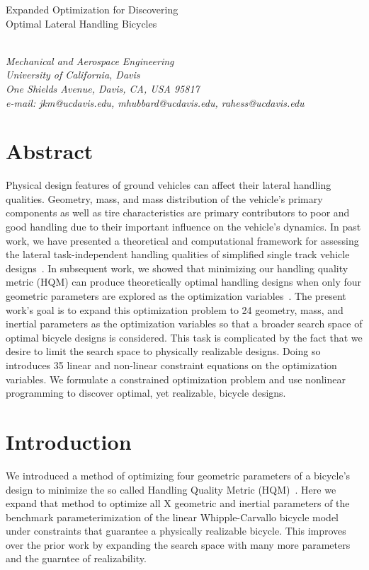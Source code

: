 \documentclass{bmd2019a}
\begin{document}
\begin{flushleft}
{\fontsize{16pt}{20pt}\selectfont%
  Expanded Optimization for Discovering\\}
{\fontsize{16pt}{20pt}\selectfont%
  Optimal Lateral Handling Bicycles}
\end{flushleft}

\begin{flushleft}
  {\\}
  \textit{Mechanical and Aerospace Engineering\\
          University of California, Davis\\
          One Shields Avenue, Davis, CA, USA 95817\\
          e-mail: jkm@ucdavis.edu, mhubbard@ucdavis.edu, rahess@ucdavis.edu}
\end{flushleft}

\section*{Abstract}
%
Physical design features of ground vehicles can affect their lateral handling
qualities. Geometry, mass, and mass distribution of the vehicle's primary
components as well as tire characteristics are primary contributors to poor and
good handling due to their important influence on the vehicle's dynamics. In
past work, we have presented a theoretical and computational framework for
assessing the lateral task-independent handling qualities of simplified single
track vehicle designs~\cite{Hess2012,Moore2012}. In subsequent work, we showed
that minimizing our handling quality metric (HQM) can produce theoretically
optimal handling designs when only four geometric parameters are explored as
the optimization variables~\cite{Moore2016}. The present work's goal is to
expand this optimization problem to 24 geometry, mass, and inertial parameters
as the optimization variables so that a broader search space of optimal bicycle
designs is considered. This task is complicated by the fact that we desire to
limit the search space to physically realizable designs. Doing so introduces 35
linear and non-linear constraint equations on the optimization variables. We
formulate a constrained optimization problem and use nonlinear programming to
discover optimal, yet realizable, bicycle designs.

\section*{Introduction}
%
We introduced a method of optimizing four geometric parameters of a bicycle's
design to minimize the so called Handling Quality Metric
(HQM)~\cite{Moore2016}. Here we expand that method to optimize all X geometric
and inertial parameters of the benchmark parameterimization of the linear
Whipple-Carvallo bicycle model under constraints that guarantee a physically
realizable bicycle. This improves over the prior work by expanding the search
space with many more parameters and the guarntee of realizability.
\end{document}
